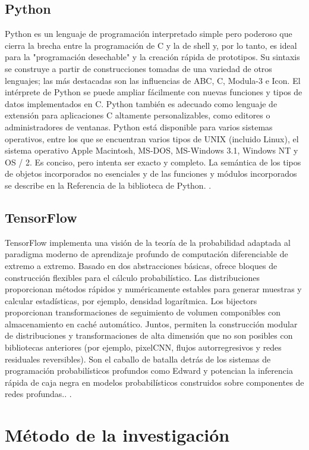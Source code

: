 \subsection{Python}
Python es un lenguaje de programación interpretado simple pero poderoso que cierra la brecha entre la programación de C y la de shell y, por lo tanto, es ideal para la "programación desechable" y la creación rápida de prototipos. Su sintaxis se construye a partir de construcciones tomadas de una variedad de otros lenguajes; las más destacadas son las influencias de ABC, C, Modula-3 e Icon. El intérprete de Python se puede ampliar fácilmente con nuevas funciones y tipos de datos implementados en C. Python también es adecuado como lenguaje de extensión para aplicaciones C altamente personalizables, como editores o administradores de ventanas. Python está disponible para varios sistemas operativos, entre los que se encuentran varios tipos de UNIX (incluido Linux), el sistema operativo Apple Macintosh, MS-DOS, MS-Windows 3.1, Windows NT y OS / 2. Es conciso, pero intenta ser exacto y completo. La semántica de los tipos de objetos incorporados no esenciales y de las funciones y módulos incorporados se describe en la Referencia de la biblioteca de Python. \citep{rossum1995python}.

\subsection{TensorFlow}
TensorFlow implementa una visión de la teoría de la probabilidad adaptada al paradigma moderno de aprendizaje profundo de computación diferenciable de extremo a extremo. Basado en dos abstracciones básicas, ofrece bloques de construcción flexibles para el cálculo probabilístico. Las distribuciones proporcionan métodos rápidos y numéricamente estables para generar muestras y calcular estadísticas, por ejemplo, densidad logarítmica. Los bijectors proporcionan transformaciones de seguimiento de volumen componibles con almacenamiento en caché automático. Juntos, permiten la construcción modular de distribuciones y transformaciones de alta dimensión que no son posibles con bibliotecas anteriores (por ejemplo, pixelCNN, flujos autorregresivos y redes residuales reversibles). Son el caballo de batalla detrás de los sistemas de programación probabilísticos profundos como Edward y potencian la inferencia rápida de caja negra en modelos probabilísticos construidos sobre componentes de redes profundas.. \citep{dillon2017tensorflow}.

\section{Método de la investigación}
